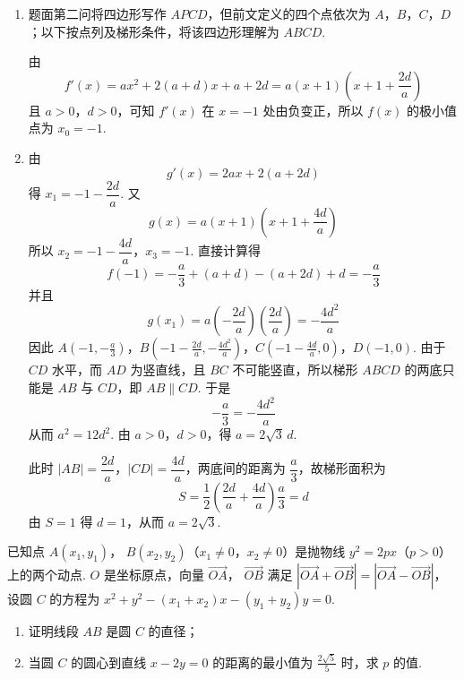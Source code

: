 \begin{solution}
\begin{enumerate}
\item 题面第二问将四边形写作 \(APCD\)，但前文定义的四个点依次为 \(A\)，\(B\)，\(C\)，\(D\)；以下按点列及梯形条件，将该四边形理解为 \(ABCD\).

由
\[
f'(x)=ax^2+2(a+d)x+a+2d=a\left(x+1\right)\left(x+1+\frac{2d}{a}\right)
\]
且 \(a>0\)，\(d>0\)，可知 \(f'(x)\) 在 \(x=-1\) 处由负变正，所以 \(f(x)\) 的极小值点为 \(x_0=-1\).
\item 由
\[
g'(x)=2ax+2(a+2d)
\]
得 \(x_1=-1-\dfrac{2d}{a}\). 又
\[
g(x)=a\left(x+1\right)\left(x+1+\frac{4d}{a}\right)
\]
所以 \(x_2=-1-\dfrac{4d}{a}\)，\(x_3=-1\). 直接计算得
\[
f(-1)=-\frac{a}{3}+(a+d)-(a+2d)+d=-\frac{a}{3}
\]
并且
\[
g(x_1)=a\left(-\frac{2d}{a}\right)\left(\frac{2d}{a}\right)=-\frac{4d^2}{a}
\]
因此
\(A\left(-1,-\frac{a}{3}\right)\)，\(B\left(-1-\frac{2d}{a},-\frac{4d^2}{a}\right)\)，\(C\left(-1-\frac{4d}{a},0\right)\)，\(D(-1,0)\).
由于 \(CD\) 水平，而 \(AD\) 为竖直线，且 \(BC\) 不可能竖直，所以梯形 \(ABCD\) 的两底只能是 \(AB\) 与 \(CD\)，即 \(AB\parallel CD\). 于是
\[
-\frac{a}{3}=-\frac{4d^2}{a}
\]
从而 \(a^2=12d^2\). 由 \(a>0\)，\(d>0\)，得 \(a=2\sqrt3\,d\).

此时 \(|AB|=\dfrac{2d}{a}\)，\(|CD|=\dfrac{4d}{a}\)，两底间的距离为 \(\dfrac{a}{3}\)，故梯形面积为
\[
S=\frac12\left(\frac{2d}{a}+\frac{4d}{a}\right)\frac{a}{3}=d
\]
由 \(S=1\) 得 \(d=1\)，从而 \(a=2\sqrt3\).
\end{enumerate}
\end{solution}

\begin{problem}
已知点 \(A(x_{1},y_{1})\)， \(B(x_{2},y_{2})\)（\(x_{1}\neq 0\)，\(x_{2}\neq 0\)）是抛物线 \(y^{2} = 2px\)（\(p > 0\)）上的两个动点. \(O\) 是坐标原点，向量 \(\overrightarrow{OA}\)， \(\overrightarrow{OB}\) 满足 \(\left|\overrightarrow{OA} +\overrightarrow{OB}\right| = \left|\overrightarrow{OA} -\overrightarrow{OB}\right|\)，设圆 \(C\) 的方程为 \(x^{2} + y^{2} - (x_{1} + x_{2})x - (y_{1} + y_{2})y = 0\).

\begin{enumerate}
\item 证明线段 \(AB\) 是圆 \(C\) 的直径；
\item 当圆 \(C\) 的圆心到直线 \(x - 2y = 0\) 的距离的最小值为 \( \frac{2\sqrt{5}}{5} \) 时，求 \(p\) 的值.
\end{enumerate}
\end{problem}

